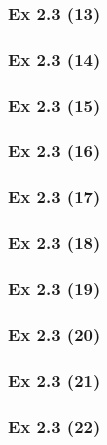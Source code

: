 \subsubsection{Ex 2.3 (13)}\label{sec:Ex_2.3.13}

\subsubsection{Ex 2.3 (14)}\label{sec:Ex_2.3.14}

\subsubsection{Ex 2.3 (15)}\label{sec:Ex_2.3.15}

\subsubsection{Ex 2.3 (16)}\label{sec:Ex_2.3.16}

\subsubsection{Ex 2.3 (17)}\label{sec:Ex_2.3.17}

\subsubsection{Ex 2.3 (18)}\label{sec:Ex_2.3.18}

\subsubsection{Ex 2.3 (19)}\label{sec:Ex_2.3.19}

\subsubsection{Ex 2.3 (20)}\label{sec:Ex_2.3.20}

\newpage		%

\subsubsection{Ex 2.3 (21)}\label{sec:Ex_2.3.21}

\subsubsection{Ex 2.3 (22)}\label{sec:Ex_2.3.22}

